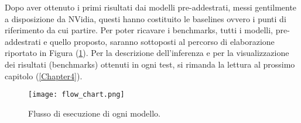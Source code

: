 Dopo aver ottenuto i primi risultati dai modelli pre-addestrati, messi gentilmente 
a disposizione da NVidia, questi hanno costituito le baselines ovvero 
i punti di riferimento da cui partire. Per poter ricavare i benchmarks, 
tutti i modelli, pre-addestrati e quello proposto, saranno sottoposti al percorso di 
elaborazione riportato in Figura (\ref{flow_chart}). Per la descrizione dell'inferenza e per la
visualizzazione dei risultati (benchmarks) ottenuti in ogni test, si rimanda la lettura al prossimo capitolo (\ref{Chapter4}).
\begin{figure}
    \centering
    \texttt{[image: flow\_chart.png]}
    \centering
    \caption{Flusso di esecuzione di ogni modello.}
    \label{flow_chart}
\end{figure}


